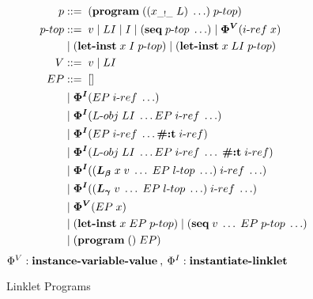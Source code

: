 \documentclass[sigplan,screen,anonymous]{acmart}
\def\dash {\text{-}}
\begin{document}
\begin{figure}[h!]
  \begin{align*}
    p           &::=\; (\textbf{program}\; ((x_{\_!\_}\; L)\; \ldots)\; p\dash top) \\
    p\dash top  &::=\; v\; |\; LI\; |\; I\; |\; (\textbf{seq}\; p\dash top\; \ldots)\; |\; \bm{\Phi^V}(i\dash ref\; x) \\
    \;          &\;|\; (\textbf{let\dash inst}\; x\; I\;p\dash top)\; |\; (\textbf{let\dash inst}\; x\; LI\;p\dash top) \\
    V           &::=\; v\; |\; LI \\
    EP          &::=\; [] \\
    \;          &\;|\; \bm{\Phi^I}(EP\; i\dash ref\; \ldots) \\ %
    \;          &\;|\; \bm{\Phi^I}(L\dash obj\; LI\; \ldots EP\; i\dash ref\; \ldots) \\ %
    \;          &\;|\; \bm{\Phi^I}(EP\; i\dash ref\; \ldots \textbf{\#:t}\; i\dash ref) \\ %
    \;          &\;|\; \bm{\Phi^I}(L\dash obj\; LI\; \ldots EP\; i\dash ref\; \ldots\; \textbf{\#:t}\; i\dash ref) \\ %
    \;          &\;|\; \bm{\Phi^I}((\lb\; x\; v\; \ldots\; EP\; l\dash top\; \ldots)\; i\dash ref\; \ldots) \\
    \;          &\;|\; \bm{\Phi^I}((\lc\; v\; \ldots\; EP\; l\dash top\; \ldots)\; i\dash ref\; \ldots) \\
    \;          &\;|\; \bm{\Phi^V}(EP\; x) \\
    \;          &\;|\; (\textbf{let\dash inst}\; x\; EP\; p\dash top)\; |\; (\textbf{seq}\; v\; \ldots\; EP\; p\dash top\; \ldots) \\
    \;          &\;|\; (\textbf{program}\; ()\; EP) \\
  \end{align*}
  \hfill \footnotesize $\Phi^V : \textbf{instance\dash variable\dash value}\:,\: \Phi^I : \textbf{instantiate\dash linklet}$
\caption{Linklet Programs}
\label{fig:linklet-program}
\end{figure}

\newcommand{\redinput}[1]{EP\;\llbracket #1 \rrbracket, \rho, \sigma\;}
\newcommand{\redoutput}[3]{EP\;\llbracket #1 \rrbracket, #2, #3\;}
\def\where {\textbf{where}\;}
\def\rel {&\longrightarrow_{\beta p}\;}
\end{document}
